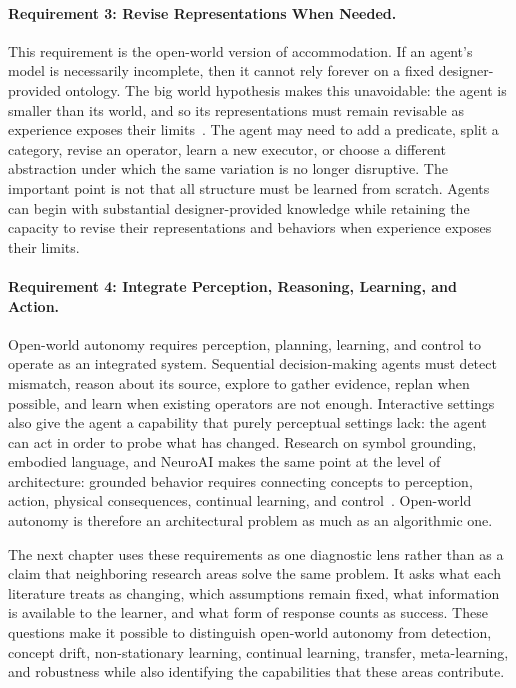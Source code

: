 \paragraph{Requirement 3: Revise Representations When Needed.}
This requirement is the open-world version of accommodation.
If an agent's model is necessarily incomplete, then it cannot rely forever on a fixed designer-provided ontology.
The big world hypothesis makes this unavoidable: the agent is smaller than its world, and so its representations must remain revisable as experience exposes their limits~\citep{javed2024bigworld}.
The agent may need to add a predicate, split a category, revise an operator, learn a new executor, or choose a different abstraction under which the same variation is no longer disruptive.
The important point is not that all structure must be learned from scratch.
Agents can begin with substantial designer-provided knowledge while retaining the capacity to revise their representations and behaviors when experience exposes their limits.

\paragraph{Requirement 4: Integrate Perception, Reasoning, Learning, and Action.}
Open-world autonomy requires perception, planning, learning, and control to operate as an integrated system.
Sequential decision-making agents must detect mismatch, reason about its source, explore to gather evidence, replan when possible, and learn when existing operators are not enough.
Interactive settings also give the agent a capability that purely perceptual settings lack: the agent can act in order to probe what has changed.
Research on symbol grounding, embodied language, and NeuroAI makes the same point at the level of architecture: grounded behavior requires connecting concepts to perception, action, physical consequences, continual learning, and control~\citep{harnad1990symbol,bisk2020experience,zador2025neuroai}.
Open-world autonomy is therefore an architectural problem as much as an algorithmic one.

The next chapter uses these requirements as one diagnostic lens rather than as a claim that neighboring research areas solve the same problem.
It asks what each literature treats as changing, which assumptions remain fixed, what information is available to the learner, and what form of response counts as success.
These questions make it possible to distinguish open-world autonomy from detection, concept drift, non-stationary learning, continual learning, transfer, meta-learning, and robustness while also identifying the capabilities that these areas contribute.
